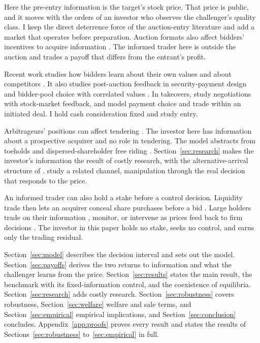 Here the pre-entry information is the target's stock price. That price is public, and it moves with the orders
of an investor who observes the challenger's quality class. I keep the direct deterrence force of the
auction-entry literature and add a market that operates before preparation. Auction formats also affect
bidders' incentives to acquire information \citep{Persico2000}. The informed trader here is outside the
auction and trades a payoff that differs from the entrant's profit.

Recent work studies how bidders learn about their own values and about competitors \citep{PernoudGleyze2026}. It also studies
post-auction feedback in security-payment design \citep{LiuBernhardt2022} and bidder-pool choice with correlated
values \citep{CarlinEtAl2026}. In takeovers, \citet{BettonEtAl2014} study negotiations with stock-market
feedback, and \citet{LinMaYangZhu2025} model payment choice and trade within an initiated deal. I hold cash
consideration fixed and study entry.

Arbitrageurs' positions can affect tendering \citep{CornelliLi2002}. The investor here has information about a
prospective acquirer and no role in tendering. The model abstracts from toeholds and dispersed-shareholder free
riding \citep{BulowHuangKlemperer1999,GrossmanHart1980}. Section~\ref{sec:research} makes the investor's
information the result of costly research, with the alternative-arrival structure of \citet{DowGorton1997}.
\citet{GoldsteinGuembel2008} study a related channel, manipulation through the real decision that responds to
the price.

An informed trader can also hold a stake before a control decision. Liquidity trade then lets an acquirer
conceal share purchases before a bid \citep{KyleVila1991}. Large holders trade on their information
\citep{Edmans2009}, monitor, or intervene as prices feed back to firm decisions
\citetext{\citealp[Section~II.E]{EdmansGoldsteinJiang2015}; \citealp{Maug1998}; \citealp{BackEtAl2018}}. The
investor in this paper holds no stake, seeks no control, and earns only the trading residual.

Section~\ref{sec:model} describes the decision interval and sets out the model. Section~\ref{sec:payoffs}
derives the two returns to information and what the challenger learns from the price.
Section~\ref{sec:results} states the main result, the benchmark with its fixed-information control, and the
coexistence of equilibria. Section~\ref{sec:research} adds costly research. Section~\ref{sec:robustness} covers
robustness, Section~\ref{sec:welfare} welfare and sale terms, and Section~\ref{sec:empirical} empirical
implications, and Section~\ref{sec:conclusion} concludes. Appendix~\ref{app:proofs} proves every result and states the
results of Sections~\ref{sec:robustness} to~\ref{sec:empirical} in full.
